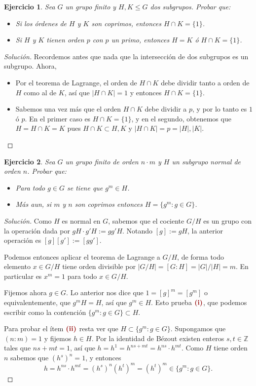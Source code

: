 \documentclass[11pt]{article}
\theoremstyle{colored}
\newtheorem{exercise}{Ejercicio}
\newcommand{\Z}{\mathbb{Z}}
\newcommand{\paint}[1]{\color{color}{#1}}
\newcommand{\tpaint}[1]{\paint{\textbf{#1}}}
\begin{document}
\begin{exercise} Sea $G$ un grupo finito y $H,K \leq G$ dos subgrupos. Probar que:
\begin{itemize}
\item[(i)] Si los órdenes de $H$ y $K$ son coprimos, entonces $H \cap K = \{1\}$.
\item[(ii)] Si $H$ y $K$ tienen orden $p$ con $p$ un primo, entonces $H = K$ ó $H \cap K = \{1\}$.
\end{itemize} 
\end{exercise}
\begin{proof}[Solución] Recordemos antes que nada que la intersección de dos subgrupos es un subgrupo. Ahora,
\begin{itemize}
\item[(i)] Por el teorema de Lagrange, el orden de $H \cap K$ debe dividir tanto a orden de $H$ como al de $K$, así que $|H \cap K| = 1$ y entonces $H \cap K = \{1\}$.
\item[(ii)] Sabemos una vez más que el orden $H \cap K$ debe dividir a $p$, y por lo tanto es $1$ ó $p$. En el primer caso es $H \cap K = \{1\}$, y en el segundo, obtenemos que $H = H \cap K = K$ pues $H \cap K \subset H,K$ y $|H \cap K|  = p = |H|,|K|$.
\end{itemize}
\end{proof}

\begin{exercise} Sea $G$ un grupo finito de orden $n \cdot m$ y $H$ un subgrupo normal de orden $n$. Probar que: 
\begin{itemize}
\item[(i)] Para todo $g \in G$ se tiene que $g^m \in H$.
\item[(ii)]Más aun, si $m$ y $n$ son coprimos entonces $H = \{g^m : g \in G\}$.
\end{itemize}
\end{exercise}
\begin{proof}[Solución] Como $H$ es normal en $G$, sabemos que el cociente $G/H$ es un grupo con la operación dada por $gH \cdot g'H := gg'H$. Notando $[g] := gH$, la anterior operación es $[g][g'] := [gg']$.

Podemos entonces aplicar el teorema de Lagrange a $G/H$, de forma todo elemento $x \in G/H$ tiene orden divisible por $|G/H| = [G:H] = |G|/|H| = m$. En particular es $x^m = 1$ para todo $x \in G/H$.

Fijemos ahora $g \in G$. Lo anterior nos dice que $1 = [g]^m = [g^m]$ o equivalentemente, que  $g^mH = H$, así que $g^m \in H$. Esto prueba $\tpaint{(i)}$, que podemos escribir como la contención $\{g^m : g \in G\} \subset H$.

Para probar el ítem $\tpaint{(ii)}$ resta ver que $H \subset \{g^m : g \in G\}$. Supongamos que $(n:m) = 1$ y fijemos $h \in H$. Por la identidad de Bézout existen enteros $s,t \in \Z$ tales que $ns + mt = 1$, así que $
h = h^1 = h^{ns+mt} = h^{ns} \cdot h^{mt}$. Como $H$ tiene orden $n$ sabemos que $(h^s)^n = 1$, y entonces
\[
h = h^{ns} \cdot h^{mt} = (h^s)^n(h^t)^m = (h^t)^m \in \{g^m : g \in G \}.
\]
\end{proof}
\end{document}
